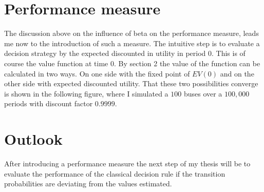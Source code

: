 \documentclass[a4paper,12pt,bold]{scrartcl}
\begin{document}
\section{Performance measure}
The discussion above on the influence of beta on the performance measure, leads me now to the introduction of such a measure. The intuitive step is to evaluate a decision strategy by the expected discounted in utility in period 0. This is of course the value function at time 0. By section 2 the value of the function can be calculated in two ways. On one side with the fixed point of $EV(0)$ and on the other side with expected discounted utility. That these two possibilities converge is shown in the following figure, where I simulated a $100$ buses over a $100,000$ periods with discount factor $0.9999$.


\section{Outlook}
After introducing a performance measure the next step of my thesis will be to evaluate the performance of the classical decision rule if the transition probabilities are deviating from the values estimated.

\newpage


\end{document}
